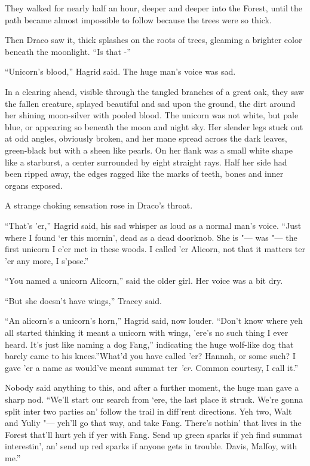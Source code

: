 They walked for nearly half an hour, deeper and deeper into the Forest,
until the path became almost impossible to follow because the trees were
so thick.

Then Draco saw it, thick splashes on the roots of trees, gleaming a
brighter color beneath the moonlight. ``Is that -''

``Unicorn's blood,'' Hagrid said. The huge man's voice was sad.

In a clearing ahead, visible through the tangled branches of a great
oak, they saw the fallen creature, splayed beautiful and sad upon the
ground, the dirt around her shining moon-silver with pooled blood. The
unicorn was not white, but pale blue, or appearing so beneath the moon
and night sky. Her slender legs stuck out at odd angles, obviously
broken, and her mane spread across the dark leaves, green-black but with
a sheen like pearls. On her flank was a small white shape like a
starburst, a center surrounded by eight straight rays. Half her side had
been ripped away, the edges ragged like the marks of teeth, bones and
inner organs exposed.

A strange choking sensation rose in Draco's throat.

``That's 'er,'' Hagrid said, his sad whisper as loud as a normal man's
voice. ``Just where I found `er this mornin', dead as a dead doorknob.
She is "--- was "--- the first unicorn I e'er met in these woods. I called 'er
Alicorn, not that it matters ter 'er any more, I s'pose.''

``You named a unicorn Alicorn,'' said the older girl. Her voice was a
bit dry.

``But she doesn't have wings,'' Tracey said.

``An alicorn's a unicorn's horn,'' Hagrid said, now louder. ``Don't know
where yeh all started thinking it meant a unicorn with wings, 'ere's no
such thing I ever heard. It's just like naming a dog Fang,'' indicating
the huge wolf-like dog that barely came to his knees.''What'd you have
called 'er? Hannah, or some such? I gave 'er a name as would've meant
summat ter \emph{'er.} Common courtesy, I call it.''

Nobody said anything to this, and after a further moment, the huge man
gave a sharp nod. ``We'll start our search from `ere, the last place it
struck. We're gonna split inter two parties an' follow the trail in
diff'rent directions. Yeh two, Walt and Yuliy "--- yeh'll go that way, and
take Fang. There's nothin' that lives in the Forest that'll hurt yeh if
yer with Fang. Send up green sparks if yeh find summat interestin', an'
send up red sparks if anyone gets in trouble. Davis, Malfoy, with me.''


